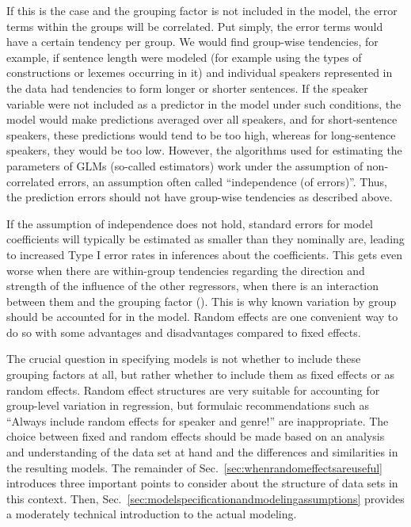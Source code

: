 If this is the case and the grouping factor is not included in the model, the error terms within the groups will be correlated.
Put simply, the error terms would have a certain tendency per group.
We would find group-wise tendencies, for example, if sentence length were modeled (for example using the types of constructions or lexemes occurring in it) and individual speakers represented in the data had tendencies to form longer or shorter sentences.
If the speaker variable were not included as a predictor in the model under such conditions, the model would make predictions averaged over all speakers, and for short-sentence speakers, these predictions would tend to be too high, whereas for long-sentence speakers, they would be too low.
However, the algorithms used for estimating the parameters of GLMs (so-called estimators) work under the assumption of non-correlated errors, an assumption often called ``independence (of errors)''.
Thus, the prediction errors should not have group-wise tendencies as described above.

If the assumption of independence does not hold, standard errors for model coefficients will typically be estimated as smaller than they nominally are, leading to increased Type I error rates in inferences about the coefficients.
This gets even worse when there are within-group tendencies regarding the direction and strength of the influence of the other regressors, \ie when there is an interaction between them and the grouping factor (\eg \citealt{SchielzethForstmeier2009}).
This is why known variation by group should be accounted for in the model.
Random effects are one convenient way to do so with some advantages and disadvantages compared to fixed effects.

The crucial question in specifying models is not whether to include these grouping factors at all, but rather whether to include them as fixed effects or as random effects.
Random effect structures are very suitable for accounting for group-level variation in regression, but formulaic recommendations such as ``Always include random effects for speaker and genre!'' are inappropriate.
The choice between fixed and random effects should be made based on an analysis and understanding of the data set at hand and the differences and similarities in the resulting models.
The remainder of Sec.~\ref{sec:whenrandomeffectsareuseful} introduces three important points to consider about the structure of data sets in this context.
Then, Sec.~\ref{sec:modelspecificationandmodelingassumptions} provides a moderately technical introduction to the actual modeling.


